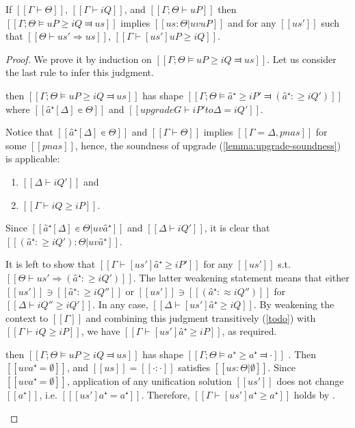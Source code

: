 \begin{lemma} \label{lemma:pos-subt-soundness}
    If $[[Γ ⊢ Θ]]$, $[[Γ ⊢ iQ]]$, and $[[Γ ; Θ ⊢ uP]]$ then\\
    $[[Γ ; Θ ⊨ uP ≥ iQ ⫤ us]]$
    implies $[[us : Θ|uv uP]]$ and 
    for any $[[us']]$ such that $[[Θ ⊢ us' ⇒ us]]$,
    $[[ Γ ⊢ [us']uP ≥ iQ ]]$.
\end{lemma}
\begin{proof} 
    We prove it by induction on $[[Γ ; Θ ⊨ uP ≥ iQ ⫤ us]]$. Let us consider the last rule to infer this judgment.
    \begin{caseof}
    \item {} then
    $[[Γ ; Θ ⊨ uP ≥ iQ ⫤ us]]$ has shape $[[Γ;Θ ⊨ â⁺ ≥ iP' ⫤ (â⁺ :≥ iQ')]]$ where
    $[[â⁺[Δ] ∊ Θ]]$ and $[[upgrade G ⊢ iP' to Δ = iQ']]$.

    Notice that $[[â⁺[Δ] ∊ Θ]]$ and $[[Γ ⊢ Θ]]$ 
    implies $[[Γ = Δ, pnas]]$ for some $[[pnas]]$, hence, the
    soundness of upgrade (\cref{lemma:upgrade-soundness}) is applicable:
    \begin{enumerate}
        \item $[[Δ ⊢ iQ']]$ and
        \item $[[Γ ⊢ iQ ≥ iP]]$.
    \end{enumerate}

    Since $[[â⁺[Δ] ∊ Θ|uv â⁺]]$ and $[[Δ ⊢ iQ']]$, it is clear that $[[(â⁺ :≥ iQ') : Θ | uv â⁺ ]]$.

    It is left to show that $[[Γ ⊢ [us']â⁺ ≥ iP']]$ for any $[[us']]$ s.t. $[[Θ ⊢ us' ⇒ (â⁺ :≥ iQ')]]$.
    The latter weakening statement means that either $[[us']] \ni [[â⁺ :≥ iQ'']]$ or
    $[[us']] \ni [[(â⁺ :≈ iQ'')]]$ for $[[Δ ⊢ iQ'' ≥ iQ']]$. In any case,
    $[[Δ ⊢ [us']â⁺ ≥ iQ]]$. By weakening the context to $[[Γ]]$ and combining this judgment
    transitively (\cref{todo}) with $[[Γ ⊢ iQ ≥ iP]]$, we have $[[Γ ⊢ [us']â⁺ ≥ iP]]$,
    as required. 

    \item \label{case:pos-subt-soundness:var}   
    then $[[Γ ; Θ ⊨ uP ≥ iQ ⫤ us]]$ has shape $[[Γ;Θ ⊨ a⁺ ≥ a⁺ ⫤ ·]]$ .
    Then $[[uv a⁺ = ∅]]$, and $[[us]] = [[· : ·]]$ satisfies $[[us : Θ|∅]]$.
    Since $[[uv a⁺ = ∅]]$, application of any unification solution $[[us']]$ does not change $[[a⁺]]$, i.e.
    $[[ [us'] a⁺ = a⁺]]$. Therefore, $[[Γ ⊢ [us']a⁺ ≥ a⁺]]$ holds by .


\end{caseof}
\end{proof}
